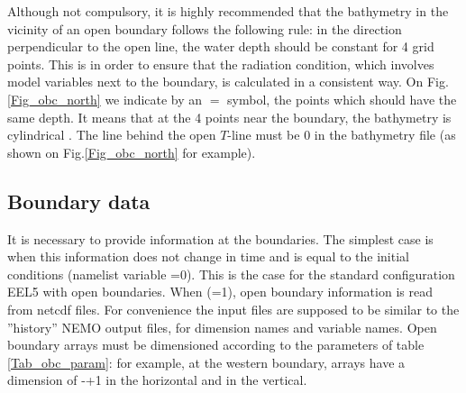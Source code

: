 Although not compulsory, it is highly recommended that the bathymetry in the 
vicinity of an open boundary follows the following rule: in the direction perpendicular 
to the open line, the water depth should be constant for 4 grid points. This is in 
order to ensure that the radiation condition, which involves model variables next 
to the boundary, is calculated in a consistent way. On Fig.\ref{Fig_obc_north} we 
indicate by an $=$ symbol, the points which should have the same depth. It means 
that at the 4 points near the boundary, the bathymetry is cylindrical . The line behind the open $T$-line must be 0 in the bathymetry file 
(as shown on Fig.\ref{Fig_obc_north} for example).

\subsection{Boundary data}
\label{OBC_data}

It is necessary to provide information at the boundaries. The simplest case is 
when this information does not change in time and is equal to the initial conditions 
(namelist variable =0). This is the case for the standard configuration 
EEL5 with open boundaries. When (=1), open boundary information 
is read from netcdf files. For convenience the input files are supposed to be similar 
to the ''history'' NEMO output files, for dimension names and variable names. 
Open boundary arrays must be dimensioned according to the parameters of table~
\ref{Tab_obc_param}: for example, at the western boundary, arrays have a 
dimension of -+1 in the horizontal and  in the vertical. 

